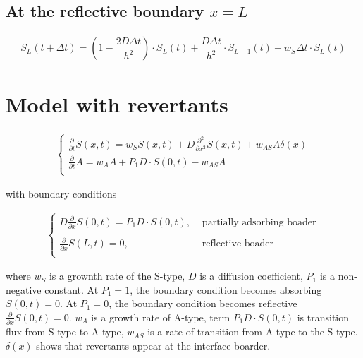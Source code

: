 \documentclass[10pt, oneside]{article}
\begin{document}
\subsection{At the  reflective boundary $x=L$}
\begin{linenomath}
	\begin{align} 
	S_L(t+\Delta t)=\left(1-\dfrac{2D\Delta t}{h^2}\right) \cdot S_L(t)+
	\dfrac{D\Delta t}{h^2}\cdot S_{L-1}(t)+
	w_S \Delta t\cdot S_L(t)
	\end{align}
\end{linenomath}


\section{Model with revertants}
\begin{linenomath}
	\begin{align} 
	\label{eq:s-revertant}
	\begin{cases}
	\frac{\partial}{\partial t} S(x,t)= w_SS(x,t) + D \frac{\partial^2}{\partial x^2} S(x,t)+w_{AS} A \delta(x) \\
	\frac{\partial}{\partial t} A = w_A A + P_1D \cdot S(0,t)-w_{AS} A\\	
	\end{cases}
	\end{align}
\end{linenomath}
%
with boundary conditions
%
\begin{linenomath}
	\begin{align} 
	\label{eq:s-boundary-revertants}
	\begin{cases}
	D \frac{\partial}{\partial x} S(0,t) = P_1D \cdot S(0,t),  &\text{ partially adsorbing boader}\\\\ 
	\frac{\partial}{\partial x} S(L,t) = 0, &\text{ reflective boader}\\
	\end{cases}
	\end{align}
\end{linenomath}
%
where $w_S$ is a grownth rate of the S-type, $D$ is a diffusion coefficient, $P_1$ is a non-negative constant.
At $P_1 = 1$,  the boundary condition becomes absorbing $S(0,t) = 0$.
At $P_1 = 0$, the boundary condition becomes reflective $\frac{\partial}{\partial x} S(0,t) = 0$. $w_A$ is a growth rate of A-type, term $P_1D \cdot S(0,t)$ is transition flux from S-type to A-type, $w_{AS}$ is a rate of transition from A-type to the S-type. $\delta(x)$ shows that revertants appear at the interface boarder.
\newline
\newline
\end{document}
